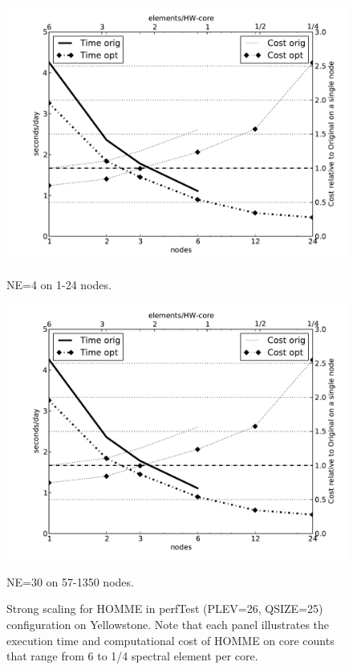 \begin{figure}
\begin{center}
\begin{minipage}{1.\textwidth}
   \begin{center}
   \includegraphics[width=1.\linewidth]{figures/homme-ys-ne4-cam.pdf}
   \caption{NE=4 on 1-24 nodes.}
   \label{fig:subA}
   \end{center}
\end{minipage}
\begin{minipage}{1.\textwidth}
   \begin{center}
   \includegraphics[width=1.\linewidth]{figures/homme-ys-ne4-cam.pdf}
    \caption{NE=30 on 57-1350 nodes.}
    \label{fig:subB}
   \end{center}
\end{minipage}%
\caption{Strong scaling for HOMME in perfTest (PLEV=26, QSIZE=25) configuration on Yellowstone.  Note that each panel illustrates the execution time and computational cost of HOMME on core counts that range from 6 to 1/4 spectral element per core. }
\label{fig:homme-ys-ne4}
\end{center}
\end{figure}

